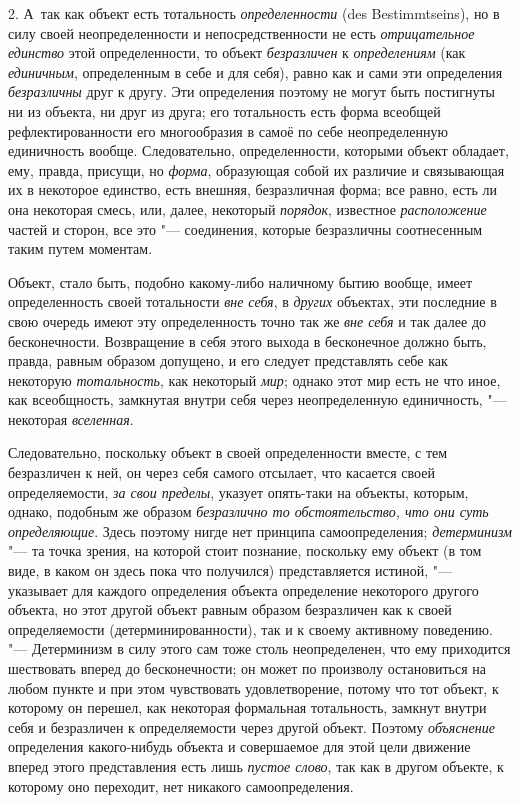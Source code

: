 2. А~так как объект есть тотальность {\em определенности} (des
Bestimmtseins), но в силу своей неопределенности и
непосредственности не есть {\em отрицательное единство}
этой определенности, то объект {\em безразличен} к
{\em определениям} (как {\em единичным},
определенным в себе и для себя), равно как и сами эти
определения {\em безразличны}
друг к другу. Эти определения поэтому не могут быть
постигнуты ни из объекта, ни друг из друга; его тотальность есть форма
всеобщей рефлектированности его многообразия в самоё по себе неопределенную
единичность вообще. Следовательно, определенности, которыми объект
обладает, ему, правда, присущи, но {\em форма}, образующая
собой их различие и связывающая их в некоторое единство, есть внешняя,
безразличная форма; все равно, есть ли она некоторая смесь, или, далее,
некоторый {\em порядок}, известное
{\em расположение} частей
и сторон, все это "--- соединения, которые безразличны
соотнесенным таким путем моментам.

Объект, стало быть, подобно какому-либо наличному бытию
вообще, имеет определенность своей тотальности
{\em вне себя}, в {\em других} объектах,
эти последние в свою очередь имеют эту определенность точно так же
{\em вне себя} и так
далее до бесконечности. Возвращение в себя этого выхода в бесконечное
должно быть, правда, равным образом допущено, и его следует представлять
себе как некоторую {\em тотальность},
как некоторый {\em мир};
однако этот мир есть не что иное, как всеобщность, замкнутая
внутри себя через неопределенную единичность, "--- некоторая {\em вселенная}.

Следовательно, поскольку объект в своей определенности вместе,
с тем безразличен к ней, он через себя самого отсылает, что касается своей
определяемости, {\em за свои пределы},
указует опять-таки на объекты, которым, однако, подобным же
образом {\em безразлично то
обстоятельство, что они суть определяющие}. Здесь поэтому
нигде нет принципа самоопределения;
{\em детерминизм} "--- та
точка зрения, на которой стоит познание, поскольку ему объект (в том виде,
в каком он здесь пока что получился) представляется истиной, "---
указывает для каждого определения объекта определение
некоторого другого объекта, но этот другой объект равным образом
безразличен как к своей определяемости (детерминированности), так и к
своему активному поведению. "--- Детерминизм в силу этого сам
тоже столь неопределенен, что ему приходится шествовать вперед до
бесконечности; он может по произволу остановиться на любом пункте и при
этом чувствовать удовлетворение, потому что тот объект, к которому он
перешел, как некоторая формальная тотальность, замкнут внутри себя и
безразличен к определяемости через другой объект. Поэтому {\em объяснение}
определения какого-нибудь объекта и совершаемое для этой цели
движение вперед этого представления есть лишь {\em пустое слово}, так
как в другом объекте, к которому оно переходит, нет никакого самоопределения.

